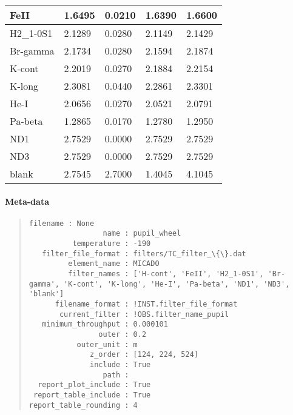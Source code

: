 \begin{longtable*}[c]{|p{0.110\DUtablewidth}|p{0.086\DUtablewidth}|p{0.086\DUtablewidth}|p{0.145\DUtablewidth}|p{0.133\DUtablewidth}|}
FeII
 & 
1.6495
 & 
0.0210
 & 
1.6390
 & 
1.6600
 \\
\hline

H2\_1-0S1
 & 
2.1289
 & 
0.0280
 & 
2.1149
 & 
2.1429
 \\
\hline

Br-gamma
 & 
2.1734
 & 
0.0280
 & 
2.1594
 & 
2.1874
 \\
\hline

K-cont
 & 
2.2019
 & 
0.0270
 & 
2.1884
 & 
2.2154
 \\
\hline

K-long
 & 
2.3081
 & 
0.0440
 & 
2.2861
 & 
2.3301
 \\
\hline

He-I
 & 
2.0656
 & 
0.0270
 & 
2.0521
 & 
2.0791
 \\
\hline

Pa-beta
 & 
1.2865
 & 
0.0170
 & 
1.2780
 & 
1.2950
 \\
\hline

ND1
 & 
2.7529
 & 
0.0000
 & 
2.7529
 & 
2.7529
 \\
\hline

ND3
 & 
2.7529
 & 
0.0000
 & 
2.7529
 & 
2.7529
 \\
\hline

blank
 & 
2.7545
 & 
2.7000
 & 
1.4045
 & 
4.1045
 \\
\hline
\end{longtable*}
\label{tbl-pupil-wheel}


\paragraph{Meta-data%
  \label{id8}%
}

\begin{quote}
\begin{alltt}
\begin{lstlisting}[frame=single]
             filename : None
                 name : pupil_wheel
          temperature : -190
   filter_file_format : filters/TC_filter_\{\}.dat
         element_name : MICADO
         filter_names : ['H-cont', 'FeII', 'H2_1-0S1', 'Br-gamma', 'K-cont', 'K-long', 'He-I', 'Pa-beta', 'ND1', 'ND3', 'blank']
      filename_format : !INST.filter_file_format
       current_filter : !OBS.filter_name_pupil
   minimum_throughput : 0.000101
                outer : 0.2
           outer_unit : m
              z_order : [124, 224, 524]
              include : True
                 path :
  report_plot_include : True
 report_table_include : True
report_table_rounding : 4
\end{lstlisting}
\end{alltt}
\end{quote}
